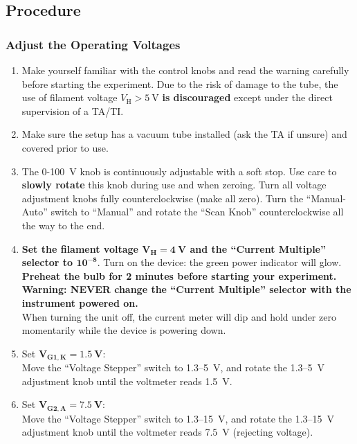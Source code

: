\documentclass[addpoints]{physlabs} %
\begin{document}
\begin{labsection}
\begin{experiment}
    \subsection*{Procedure}
    
    \subsubsection*{Adjust the Operating Voltages}
    
    \begin{enumerate}
        \item Make yourself familiar with the control knobs and read the warning carefully before starting the experiment. Due to the risk of damage to the tube, the use of filament voltage $V_\text{H}>\qty{5}{\volt}$ \textbf{is discouraged} except under the direct supervision of a TA/TI.
    
        \item Make sure the setup has a vacuum tube installed (ask the TA if unsure) and covered prior to use.
        
        \item The 0-100~V knob is continuously adjustable with a soft stop. Use care to \textbf{slowly rotate} this knob during use and when zeroing. Turn all voltage adjustment knobs fully counterclockwise (make all zero). Turn the ``Manual-Auto'' switch to ``Manual'' and rotate the ``Scan Knob'' counterclockwise all the way to the end.
        
        \item \textbf{Set the filament voltage $\mathbf{V_H=4~V}$ and the ``Current Multiple'' selector to $\mathbf{10^{-8}}$}. Turn on the device: the green power indicator will glow. \textbf{Preheat the bulb for 2 minutes before starting your experiment.}\\[-1em]
        
        \textbf{Warning: NEVER change the ``Current Multiple'' selector with the instrument powered on.}\\
        When turning the unit off, the current meter will dip and hold under zero momentarily while the device is powering down.
        
        \item Set $\mathbf{V_{G1,K}=1.5~V}$:\\
        Move the ``Voltage Stepper'' switch to 1.3–5~V, and rotate the 1.3–5~V adjustment knob until the voltmeter reads \qty{1.5}{\volt}.
        
        \item Set $\mathbf{V_{G2,A}=7.5~V}$:\\
        Move the ``Voltage Stepper'' switch to 1.3–15~V, and rotate the 1.3–15~V adjustment knob until the voltmeter reads \qty{7.5}{\volt} (rejecting voltage).
    \end{enumerate}
    

\end{experiment}
\end{labsection}
\end{document}
